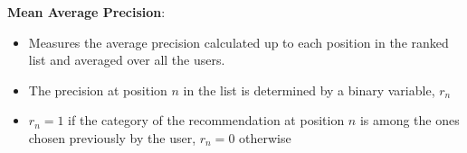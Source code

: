 

    \begin{block}{\textbf{Mean Average Precision}: }
        \begin{itemize}
            \item Measures the average precision calculated up to each position in the ranked list and averaged over all the users.
            \item The precision at position $n$ in the list is determined by a binary variable, $r_n$
            \item $r_n=1$ if the category of the recommendation at position $n$ is among the ones chosen previously by the user, $r_n=0$ otherwise
        \end{itemize}
    \end{block}